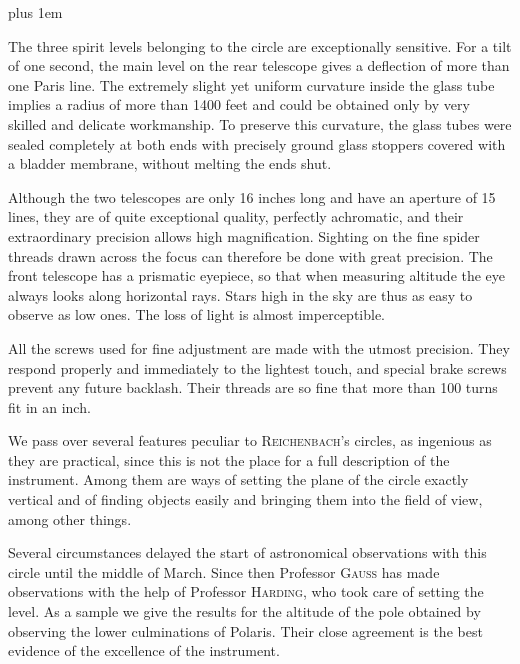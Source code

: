 \begingroup\rightskip=0pt plus 1em \par\indent The three spirit levels belonging to the circle are exceptionally sensitive. For a tilt of one second, the main level on the rear telescope gives a deflection of more than one Paris line. The extremely slight yet uniform curvature inside the glass tube implies a radius of more than 1400 feet and could be obtained only by very skilled and delicate workmanship. To preserve this curvature, the glass tubes were sealed completely at both ends with precisely ground glass stoppers covered with a bladder membrane, without melting the ends shut.\par\endgroup

\par\indent Although the two telescopes are only 16 inches long and have an aperture of 15 lines, they are of quite exceptional quality, perfectly achromatic, and their extraordinary precision allows high magnification. Sighting on the fine spider threads drawn across the focus can therefore be done with great precision. The front telescope has a prismatic eyepiece, so that when measuring altitude the eye always looks along horizontal rays. Stars high in the sky are thus as easy to observe as low ones. The loss of light is almost imperceptible.

\par\indent All the screws used for fine adjustment are made with the utmost precision. They respond properly and immediately to the lightest touch, and special brake screws prevent any future backlash. Their threads are so fine that more than 100 turns fit in an inch.

\par\indent We pass over several features peculiar to \textsc{Reichenbach}’s circles, as ingenious as they are practical, since this is not the place for a full description of the instrument. Among them are ways of setting the plane of the circle exactly vertical and of finding objects easily and bringing them into the field of view, among other things.

\par\indent Several circumstances delayed the start of astronomical observations with this circle until the middle of March. Since then Professor \textsc{Gauss} has made observations with the help of Professor \textsc{Harding}, who took care of setting the level. As a sample we give the results for the altitude of the pole obtained by observing the lower culminations of Polaris. Their close agreement is the best evidence of the excellence of the instrument.

